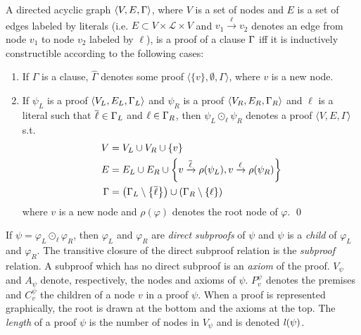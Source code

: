 \documentclass{llncs}
\begin{document}
\newcommand{\axiom}[1]{\widehat{#1}}
\newcommand{\n}{v}
\newcommand{\raiz}[1]{\rho(#1)}

\begin{definition}[Proof] 
\label{def:proof}
A directed acyclic graph $\langle V, E, \Gamma \rangle$, where $V$ is a set of nodes and $E$ is a
set of edges labeled by literals (i.e. $E \subset V \times \mathcal{L} \times V$ and $\n_1
\xrightarrow{\ell} \n_2$ denotes an edge from node $\n_1$ to node $\n_2$ labeled by $\ell$), is a
proof of a clause $\Gamma$ iff it is inductively constructible according to the following cases:
%
\begin{enumerate}
  \item If $\Gamma$ is a clause, $\axiom{\Gamma}$ denotes some proof $\langle \{ \n \}, \emptyset ,
    \Gamma \rangle$, where $\n$ is a new node.
  \item If $\psi_L$ is a proof $\langle V_L, E_L, \Gamma_L \rangle$ and
    $\psi_R$ is a proof $\langle V_R, E_R, \Gamma_R \rangle$ and $\ell$ is a literal such that
    $\overline{\ell} \in \Gamma_L$ and $\ell \in \Gamma_R$, then
    $\psi_L \odot_\ell \psi_R$ denotes a proof $\langle V, E, \Gamma \rangle$ s.t.
    \begin{align*}
      V &= V_L \cup V_R \cup \{\n \} \\
      E &= E_L \cup E_R \cup
                    \left\{ \n \xrightarrow{\dual{\ell}} \raiz{\psi_L}, \n \xrightarrow{\ell} \raiz{\psi_R} \right\} \\
     \Gamma &= \left( \clause_L \setminus \left\{ \dual{\ell} \right\} \right) \cup \left( \clause_R
                    \setminus \left\{ \ell \right\} \right)
    \end{align*}
    where $\n$ is a new node and $\raiz{\varphi}$ denotes the root node of $\varphi$.
  \qed
\end{enumerate}
\end{definition}


\newcommand{\Vertices}[1]{V_{#1}}
\newcommand{\Edges}[1]{E_{#1}}
\newcommand{\Conclusion}[1]{\clause_{#1}}
\newcommand{\Premises}[2]{P_{#1}^{#2}}
\newcommand{\Children}[2]{C_{#1}^{#2}}
\newcommand{\Axioms}[1]{A_{#1}}

\noindent
If $\psi = \varphi_L \odot_{\ell} \varphi_R$, then $\varphi_L$ and $\varphi_R$ are \emph{direct
subproofs} of $\psi$ and $\psi$ is a \emph{child} of $\varphi_L$ and $\varphi_R$. The
transitive closure of the direct subproof relation is the \emph{subproof} relation. A subproof which
has no direct subproof is an \emph{axiom} of the proof. 
%
$\Vertices{\psi}$ and $\Axioms{\psi}$
denote, respectively, the nodes and axioms of $\psi$. $\Premises{\n}{\psi}$ denotes the premises and $\Children{\n}{\psi}$ the children of a node $\n$ in a proof $\psi$. When a proof is represented graphically, the root is drawn at the bottom and the axioms at the top. The \emph{length} of a proof $\psi$ is the number of nodes in $\Vertices{\psi}$ and is denoted $\mathit{l}(\psi)$.
\end{document}
